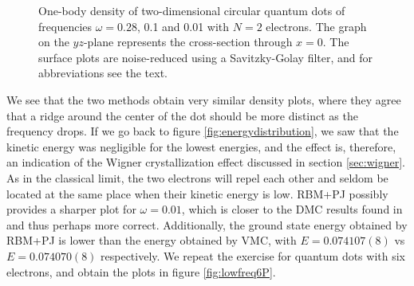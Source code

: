 \begin{figure}
	\hspace{0.1cm}
	\hspace{-0.cm}
	\hspace{-0.cm}
	
	\caption{One-body density of two-dimensional circular quantum dots of frequencies $\omega=0.28$, 0.1 and 0.01 with $N=2$ electrons. The graph on the $yz$-plane represents the cross-section through $x=0$. The surface plots are noise-reduced using a Savitzky-Golay filter, and for abbreviations see the text.}
	\label{fig:lowfreq2P}
\end{figure}

We see that the two methods obtain very similar density plots, where they agree that a ridge around the center of the dot should be more distinct as the frequency drops. If we go back to figure \eqref{fig:energydistribution}, we saw that the kinetic energy was negligible for the lowest energies, and the effect is, therefore, an indication of the Wigner crystallization effect discussed in section \ref{sec:wigner}. As in the classical limit, the two electrons will repel each other and seldom be located at the same place when their kinetic energy is low. RBM+PJ possibly provides a sharper plot for $\omega=0.01$, which is closer to the DMC results found in \citet{hogberget_quantum_2013} and thus perhaps more correct. Additionally, the ground state energy obtained by RBM+PJ is lower than the energy obtained by VMC, with $E=0.074107(8)$ vs $E=0.074070(8)$ respectively. We repeat the exercise for quantum dots with six electrons, and obtain the plots in figure \eqref{fig:lowfreq6P}.

